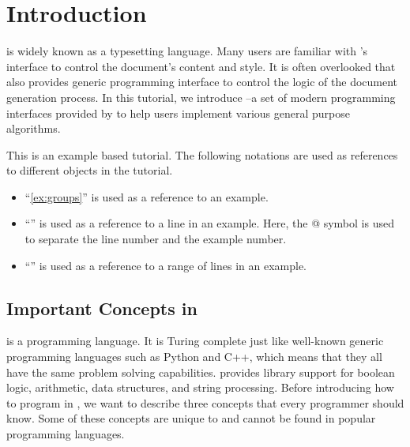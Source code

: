 \section{Introduction}

\LT{} is widely known as a typesetting language.
Many \LT{} users are familiar with \LT{}'s interface to control the document's content and style.
It is often overlooked that \LT{} also provides generic programming interface to control the logic of the document generation process.
In this tutorial, we introduce \LTT{}--a set of modern programming interfaces provided by \LT{} to help users implement various general purpose algorithms.

This is an example based tutorial. 
The following notations are used as references to different objects in the tutorial.
\begin{itemize}
  \item ``\cref{ex:groups}'' is used as a reference to an example.
  \item ``'' is used as a reference to a line in an example. Here, the @ symbol is used to separate the line number and the example number.
  \item ``'' is used as a reference to a range of lines in an example.
\end{itemize}

\subsection{Important Concepts in \LT{}}\label{sec:important-concepts}

\LT{} is a programming language. 
It is Turing complete just like well-known generic programming languages such as Python and C++, which means that they all have the same problem solving capabilities.
\LT{} provides library support for boolean logic, arithmetic, data structures, and string processing.
Before introducing how to program in \LT{}, we want to describe three concepts that every \LT{} programmer should know.
Some of these concepts are unique to \LT{} and cannot be found in popular programming languages.


